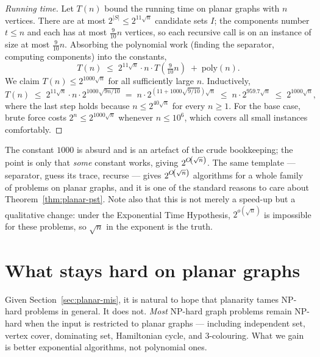 \begin{proof}[Running time]
Let $T(n)$ bound the running time on planar graphs with $n$ vertices. There are
at most $2^{|S|} \le 2^{11\sqrt{n}}$ candidate sets $I$; the components number
$t \le n$ and each has at most $\tfrac{9}{10}n$ vertices, so each recursive
call is on an instance of size at most $\tfrac{9}{10}n$. Absorbing the
polynomial work (finding the separator, computing components) into the
constants,
\[
  T(n) \;\le\; 2^{11\sqrt{n}} \cdot n \cdot T\!\left(\tfrac{9}{10}n\right)
  \;+\; \mathrm{poly}(n).
\]
We claim $T(n) \le 2^{1000\sqrt{n}}$ for all sufficiently large $n$. Inductively,
\[
  T(n) \;\le\; 2^{11\sqrt n}\cdot n\cdot 2^{1000\sqrt{9n/10}}
   \;=\; n \cdot 2^{\left(11 + 1000\sqrt{9/10}\right)\sqrt n}
   \;\le\; n \cdot 2^{959.7\sqrt{n}}
   \;\le\; 2^{1000\sqrt n},
\]
where the last step holds because $n \le 2^{40\sqrt n}$ for every $n \ge 1$.
For the base case, brute force costs $2^n \le 2^{1000\sqrt n}$ whenever
$n \le 10^6$, which covers all small instances comfortably.
\end{proof}

\begin{remark}
The constant $1000$ is absurd and is an artefact of the crude bookkeeping; the
point is only that \emph{some} constant works, giving
$2^{O\!\left(\sqrt n\right)}$. The same template --- separator, guess its trace,
recurse --- gives $2^{O\!\left(\sqrt n\right)}$ algorithms for a whole family of
problems on planar graphs, and it is one of the standard reasons to care about
Theorem~\ref{thm:planar-pst}. Note also that this is not merely a speed-up but a
qualitative change: under the Exponential Time Hypothesis, $2^{o(\sqrt n)}$ is
impossible for these problems, so $\sqrt n$ in the exponent is the truth.
\end{remark}

\section{What stays hard on planar graphs}\label{sec:planar-hardness}

Given Section~\ref{sec:planar-mis}, it is natural to hope that planarity tames NP-hard
problems in general. It does not. \emph{Most} NP-hard graph problems remain
NP-hard when the input is restricted to planar graphs --- including independent
set, vertex cover, dominating set, Hamiltonian cycle, and $3$-colouring. What
we gain is better exponential algorithms, not polynomial ones.

